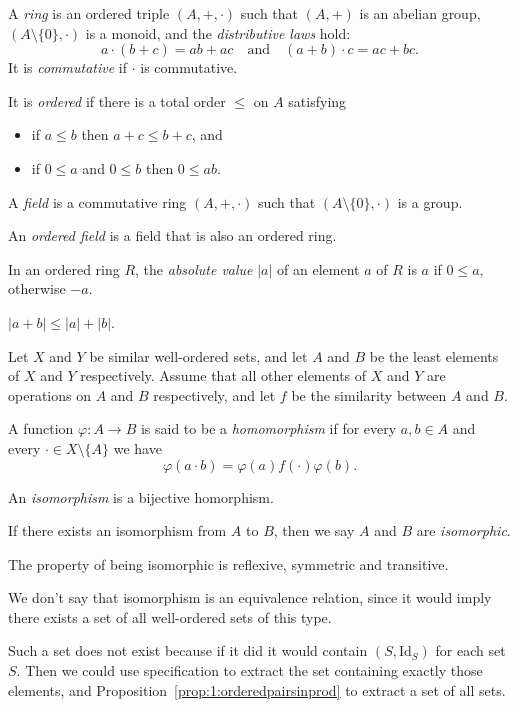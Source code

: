   \begin{defn}
    A \emph{ring} is an ordered triple $(A,+,\cdot)$ such that $(A,+)$ is an
    abelian group, $(A\setminus \{0\},\cdot)$ is a monoid, and the
    \emph{distributive laws} hold:
    \[a\cdot(b+c)=ab+ac\quad\text{and}\quad (a+b)\cdot c=ac+bc.\]
    It is \emph{commutative} if $\cdot$ is commutative.

    It is \emph{ordered} if there is a total order $\le$ on $A$ satisfying
    \begin{itemize}
      \item if $a\le b$ then $a+c\le b+c$, and
      \item if $0\le a$ and $0\le b$ then $0\le ab$.
    \end{itemize}
  \end{defn}
  \begin{defn}
    A \emph{field} is a commutative ring $(A,+,\cdot)$ such that $(A\setminus
    \{0\},\cdot)$ is a group.

    An \emph{ordered field} is a field that is also an ordered ring.
  \end{defn}
  \begin{defn}
    In an ordered ring $R$, the \emph{absolute value} $|a|$ of an element $a$
    of $R$ is $a$ if $0\le a$, otherwise $-a$.
  \end{defn}
  \begin{prop}
    $|a+b|\le|a|+|b|$.
  \end{prop}
  \begin{defn}
    Let $X$ and $Y$ be similar well-ordered sets, and let $A$ and $B$ be the
    least elements of $X$ and $Y$ respectively. Assume that all other elements
    of $X$ and $Y$ are operations on $A$ and $B$ respectively, and let $f$ be
    the similarity between $A$ and $B$.

    A function $\varphi:A\to B$ is said
    to be a \emph{homomorphism} if
    for every $a,b\in A$ and every $\cdot\in X\setminus \{A\}$ we
    have \[\varphi(a\cdot b)=\varphi(a) f(\cdot) \varphi(b).\]

    An \emph{isomorphism} is a bijective homorphism.

    If there exists an isomorphism from $A$ to $B$, then we say $A$ and $B$ are
    \emph{isomorphic}.
  \end{defn}
  \begin{prop}
    The property of being isomorphic is reflexive, symmetric and transitive.
  \end{prop}
  \begin{rem}
    We don't say that isomorphism is an equivalence relation, since it would
    imply there exists a set of all well-ordered sets of this type.

    Such a set does not exist because if it did it would contain
    $(S,\mathrm{Id}_S)$ for each set $S$. Then we could use specification to
    extract the set containing exactly those elements, and
    Proposition~\ref{prop:1:orderedpairsinprod} to extract a set of all sets.
  \end{rem}
